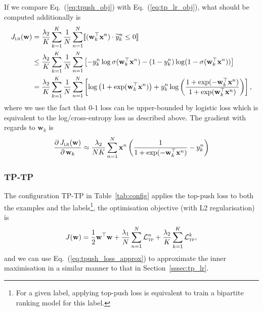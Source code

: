 \documentclass[9pt]{extarticle}
\newcommand{\llb}{\llbracket}
\newcommand{\rrb}{\rrbracket}
\newcommand{\x}{\mathbf{x}}
\newcommand{\1}{\mathbf{1}}
\newcommand{\w}{\mathbf{w}}
\newcommand{\LCal}{\mathcal{L}}
\begin{document}
If we compare Eq.~(\ref{eq:tpush_obj}) with Eq.~(\ref{eq:tp_lr_obj}), what should be computed additionally is
\begin{align*}
J_\textsc{lr}(\w) 
&= \frac{\lambda_2}{K} \sum_{k=1}^K \frac{1}{N} \sum_{n=1}^N \llb (\w_k^\top \x^n) \cdot \widetilde{y}_k^n \le 0 \rrb \\
&\le \frac{\lambda_2}{K} \sum_{k=1}^K \frac{1}{N} \sum_{n=1}^N 
     \left[ -y_k^n \log \sigma(\w_k^\top \x^n) - (1 - y_k^n) \log (1 - \sigma(\w_k^\top \x^n)) \right] \\
&= \frac{\lambda_2}{K} \sum_{k=1}^K \frac{1}{N} \sum_{n=1}^N
   \left[ \log \left( 1 + \exp(\w_k^\top \x^n) \right) + 
          y_k^n \log \left( \frac{1 + \exp(-\w_k^\top \x^n)} {1 + \exp(\w_k^\top \x^n)} \right) \right],
\end{align*}
where we use the fact that 0-1 loss can be upper-bounded by logistic loss which is equivalent to the log/cross-entropy loss as described above.
The gradient with regards to $\w_k$ is
$$
\frac{\partial \, J_\textsc{lr}(\w)} {\partial \, \w_k}
\approx \frac{\lambda_2}{NK} \sum_{n=1}^N \x^n \left( \frac{1}{1 + \exp(-\w_k^\top \x^n)} - y_k^n \right)
$$


\subsubsection{TP-TP}
\label{sssec:tp_tp}

The configuration TP-TP in Table~\ref{tab:config} applies the top-push loss to both the examples and 
the labels\footnote{For a given label, applying top-push loss is equivalent to train a bipartite ranking model for this label.},
the optimisation objective (with L2 regularisation) is
\begin{equation}
\label{eq:tp_tp_obj}
J(\w) = \frac{1}{2} \w^\top \w + \frac{\lambda_1}{N} \sum_{n=1}^N \LCal_\textsc{tp}^n + \frac{\lambda_2}{K} \sum_{k=1}^K \LCal_\textsc{tp}^k,
\end{equation}
and we can use Eq.~(\ref{eq:tpush_loss_approx}) to approximate the inner maximisation in a similar manner to that in Section~\ref{sssec:tp_lr}.
\end{document}

